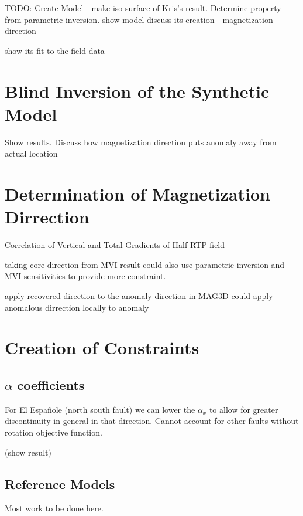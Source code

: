 TODO: Create Model
- make iso-surface of Kris's result. Determine property from parametric inversion.
show model
discuss its creation
- magnetization direction

show its fit to the field data

\section{Blind Inversion of the Synthetic Model}
\label{sec:Blind Inversion of the Synthetic Mode1:ElPoma}

Show results. Discuss how magnetization direction puts anomaly away from actual location

\section{Determination of Magnetization Dirrection}
\label{sec:Determination of Magnetization Dirrection}

Correlation of Vertical and Total Gradients of Half RTP field \cite{dannemiller2006MagDirection}

taking core direction from MVI result 
could also use parametric inversion and MVI sensitivities to provide more constraint.

apply recovered direction to the anomaly direction in MAG3D
could apply anomalous dirrection locally to anomaly 

\section{Creation of Constraints}
\label{sec:Creation of Constraints:ElPoma}

\subsection{$\alpha$ coefficients}
\label{sec:alpha coefficients:ElPoma}

For El Espa\~nole (north south fault) we can lower the $\alpha_x$ to allow for greater discontinuity in general in that direction. Cannot account for other faults without rotation objective function.

(show result)

\subsection{Reference Models}
\label{sec:Reference Models:ElPoma}

Most work to be done here. 

